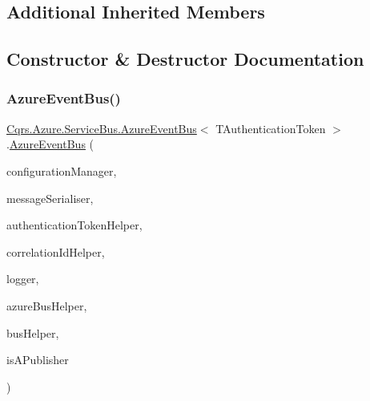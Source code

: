 \subsection*{Additional Inherited Members}


\subsection{Constructor \& Destructor Documentation}
\mbox{\label{classCqrs_1_1Azure_1_1ServiceBus_1_1AzureEventBus_aaaf74d2e4e79924b7231750478508ed6_aaaf74d2e4e79924b7231750478508ed6}} 
\subsubsection{\texorpdfstring{Azure\+Event\+Bus()}{AzureEventBus()}}
{\footnotesize\ttfamily \hyperlink{classCqrs_1_1Azure_1_1ServiceBus_1_1AzureEventBus}{Cqrs.\+Azure.\+Service\+Bus.\+Azure\+Event\+Bus}$<$ T\+Authentication\+Token $>$.\hyperlink{classCqrs_1_1Azure_1_1ServiceBus_1_1AzureEventBus}{Azure\+Event\+Bus} (\begin{DoxyParamCaption}\item[{\hyperlink{interfaceCqrs_1_1Configuration_1_1IConfigurationManager}{I\+Configuration\+Manager}}]{configuration\+Manager,  }\item[{\hyperlink{interfaceCqrs_1_1Azure_1_1ServiceBus_1_1IMessageSerialiser}{I\+Message\+Serialiser}$<$ T\+Authentication\+Token $>$}]{message\+Serialiser,  }\item[{\hyperlink{interfaceCqrs_1_1Authentication_1_1IAuthenticationTokenHelper}{I\+Authentication\+Token\+Helper}$<$ T\+Authentication\+Token $>$}]{authentication\+Token\+Helper,  }\item[{I\+Correlation\+Id\+Helper}]{correlation\+Id\+Helper,  }\item[{I\+Logger}]{logger,  }\item[{\hyperlink{interfaceCqrs_1_1Azure_1_1ServiceBus_1_1IAzureBusHelper}{I\+Azure\+Bus\+Helper}$<$ T\+Authentication\+Token $>$}]{azure\+Bus\+Helper,  }\item[{\hyperlink{interfaceCqrs_1_1Bus_1_1IBusHelper}{I\+Bus\+Helper}}]{bus\+Helper,  }\item[{bool}]{is\+A\+Publisher }\end{DoxyParamCaption})\hspace{0.3cm}{\ttfamily [protected]}}



